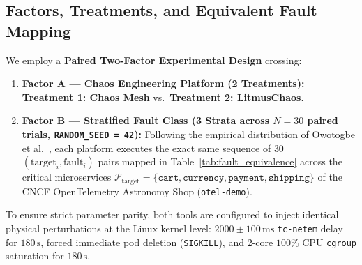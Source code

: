 \subsection{Factors, Treatments, and Equivalent Fault Mapping}
We employ a \textbf{Paired Two-Factor Experimental Design} crossing:
\begin{enumerate}[leftmargin=1.2em, itemsep=2pt, topsep=3pt]
    \item \textbf{Factor A — Chaos Engineering Platform (2 Treatments):} \textbf{Treatment 1: Chaos Mesh} vs.\ \textbf{Treatment 2: LitmusChaos}.
    \item \textbf{Factor B — Stratified Fault Class (3 Strata across $N=30$ paired trials, \texttt{RANDOM\_SEED = 42}):} Following the empirical distribution of Owotogbe et al.~\cite{owotogbe2026chaos}, each platform executes the exact same sequence of $30$ $(\text{target}_i, \text{fault}_i)$ pairs mapped in Table~\ref{tab:fault_equivalence} across the critical microservices $\mathcal{P}_{\text{target}} = \{\texttt{cart},\allowbreak \texttt{currency},\allowbreak \texttt{payment},\allowbreak \texttt{shipping}\}$ of the CNCF OpenTelemetry Astronomy Shop (\texttt{otel-demo}).
\end{enumerate}
To ensure strict parameter parity, both tools are configured to inject identical physical perturbations at the Linux kernel level: $2000 \pm 100\,\text{ms}$ \texttt{tc-netem} delay for $180\,\text{s}$, forced immediate pod deletion (\texttt{SIGKILL}), and 2-core $100\%$ CPU \texttt{cgroup} saturation for $180\,\text{s}$.
